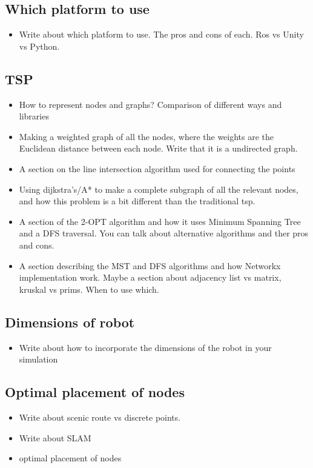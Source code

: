 \subsection{Which platform to use}
\begin{itemize}
    \item Write about which platform to use. The pros and cons of each. Ros vs Unity vs Python.
\end{itemize}


\subsection{TSP}
\begin{itemize}
    \item How to represent nodes and graphs? Comparison of different ways and libraries
    \item Making a weighted graph of all the nodes, where the weights are the Euclidean distance between each node. Write that it is a undirected graph.
    \item A section on the line intersection algorithm used for connecting the points
    \item Using dijkstra's/A* to make a complete subgraph of all the relevant nodes, and how this problem is a bit different than the traditional tsp.
    \item A section of the 2-OPT algorithm and how it uses Minimum Spanning Tree and a DFS traversal. You can talk about alternative algorithms and ther pros and cons.
    \item A section describing the MST and DFS algorithms and how Networkx implementation work. Maybe a section about adjacency list vs matrix, kruskal vs prims. When to use which.
\end{itemize}

\subsection{Dimensions of robot}
\begin{itemize}
    \item Write about how to incorporate the dimensions of the robot in your simulation
\end{itemize}

\subsection{Optimal placement of nodes}
\begin{itemize}
    \item Write about scenic route vs discrete points.
    \item Write about SLAM
    \item optimal placement of nodes
\end{itemize}

